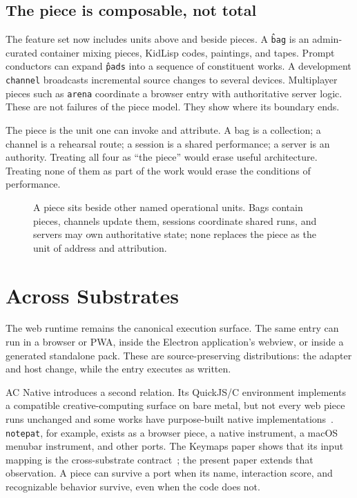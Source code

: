 \documentclass[10pt,letterpaper,twocolumn]{article}
\newcommand{\code}[1]{\texttt{#1}}
\begin{document}
\subsection{The piece is composable, not total}

The feature set now includes units above and beside pieces. A \code{\^bag} is an admin-curated container mixing pieces, KidLisp codes, paintings, and tapes. Prompt conductors can expand \code{\^pads} into a sequence of constituent works. A development \code{channel} broadcasts incremental source changes to several devices. Multiplayer pieces such as \code{arena} coordinate a browser entry with authoritative server logic. These are not failures of the piece model. They show where its boundary ends.

The piece is the unit one can invoke and attribute. A bag is a collection; a channel is a rehearsal route; a session is a shared performance; a server is an authority. Treating all four as ``the piece'' would erase useful architecture. Treating none of them as part of the work would erase the conditions of performance.

\begin{figure}[t]
\centering
\resizebox{0.86\textwidth}{!}{}
\caption{A piece sits beside other named operational units. Bags contain pieces, channels update them, sessions coordinate shared runs, and servers may own authoritative state; none replaces the piece as the unit of address and attribution.}
\label{fig:ecology}
\end{figure}

\section{Across Substrates}

The web runtime remains the canonical execution surface. The same entry can run in a browser or PWA, inside the Electron application's webview, or inside a generated standalone pack. These are source-preserving distributions: the adapter and host change, while the entry executes as written.

AC Native introduces a second relation. Its QuickJS/C environment implements a compatible creative-computing surface on bare metal, but not every web piece runs unchanged and some works have purpose-built native implementations~\citep{scudder2026os}. \code{notepat}, for example, exists as a browser piece, a native instrument, a macOS menubar instrument, and other ports. The Keymaps paper shows that its input mapping is the cross-substrate contract~\citep{scudder2026keymaps}; the present paper extends that observation. A piece can survive a port when its name, interaction score, and recognizable behavior survive, even when the code does not.
\end{document}
